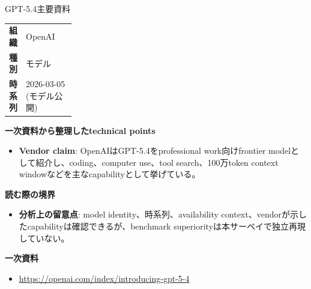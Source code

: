 \begin{technicalnote}{GPT-5.4}{主要資料}
\begingroup
\begin{tabularx}{\linewidth}{@{}>{\bfseries}p{0.22\linewidth}X@{}}
組織 & OpenAI \\
種別 & モデル \\
時系列 & 2026-03-05 (モデル公開) \\
\end{tabularx}
\smallskip
{\bfseries 一次資料から整理したtechnical points}
\begin{itemize}[leftmargin=1.5em,itemsep=0.35em]
\item \textbf{Vendor claim}: OpenAIはGPT-5.4をprofessional work向けfrontier modelとして紹介し、coding、computer use、tool search、100万token context windowなどを主なcapabilityとして挙げている。
\end{itemize}
\begin{minipage}{\linewidth}
{\bfseries 読む際の境界}
\begin{itemize}[leftmargin=1.5em,itemsep=0.35em]
\item \textbf{分析上の留意点}: model identity、時系列、availability context、vendorが示したcapabilityは確認できるが、benchmark superiorityは本サーベイで独立再現していない。
\end{itemize}
\begin{samepage}
{\bfseries 一次資料}
\begingroup\sloppy
\begin{itemize}[leftmargin=1.5em,itemsep=0.25em]
\item {\scriptsize\url{https://openai.com/index/introducing-gpt-5-4}}
\end{itemize}
\endgroup
\end{samepage}
\end{minipage}
\endgroup
\end{technicalnote}
\medskip

